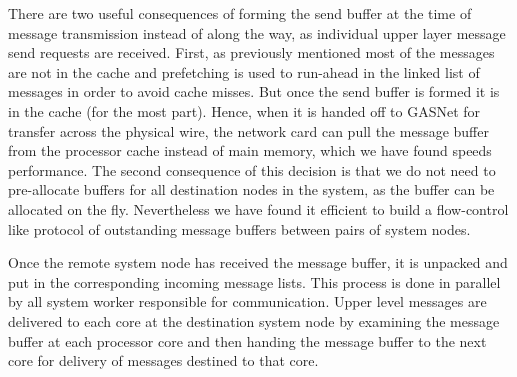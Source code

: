 There are two useful consequences of forming the send buffer at the time of
message transmission instead of along the way, as individual upper layer
message send requests are received. First, as previously mentioned most of the
messages are not in the cache and prefetching is used to run-ahead in the
linked list of messages in order to avoid cache misses. But once the send
buffer is formed it is in the cache (for the most part). Hence, when it is
handed off to GASNet for transfer across the physical wire, the network card
can pull the message buffer from the processor cache instead of main memory,
which we have found speeds performance. The second consequence of this
decision is that we do not need to pre-allocate buffers for all destination
nodes in the system, as the buffer can be allocated on the fly. Nevertheless
we have found it efficient to build a flow-control like protocol of
outstanding message buffers between pairs of system nodes.

Once the remote system node has received the message buffer, it is unpacked
and put in the corresponding incoming message lists. This process is done in
parallel by all system worker responsible for communication. Upper level
\Grappa messages are delivered to each core at the destination system node by
examining the message buffer at each processor core and then handing the
message buffer to the next core for delivery of messages destined to that
core.




%
%
%
%
%
% 
% 
% 
